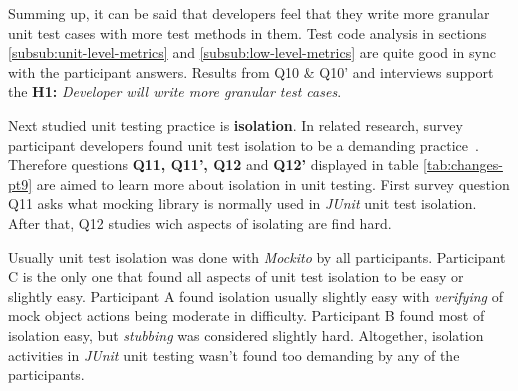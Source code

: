 Summing up, it can be said that developers feel that they write more granular unit test cases with more test methods in them.
Test code analysis in sections \ref{subsub:unit-level-metrics} and \ref{subsub:low-level-metrics}
are quite good in sync with the participant answers.
Results from Q10 \& Q10' and interviews support the \textbf{H1:} \textit{Developer will write more granular test cases}.

Next studied unit testing practice is \textbf{isolation}. In related research, survey participant developers found unit test isolation to be a demanding practice~\cite{daka2014survey}.
Therefore questions \textbf{Q11, Q11', Q12} and \textbf{Q12'} displayed in table \ref{tab:changes-pt9} are aimed to learn more about isolation in unit testing.
First survey question Q11 asks what mocking library is normally used in \textit{JUnit} unit test isolation. After that,
Q12 studies wich aspects of isolating are find hard.

Usually unit test isolation was done with \textit{Mockito} by all participants. Participant C is the only
one that found all aspects of unit test isolation to be easy or slightly easy. Participant A found isolation
usually slightly easy with \textit{verifying} of mock object actions being moderate in difficulty. Participant B
found most of isolation easy, but \textit{stubbing} was considered slightly hard. Altogether, isolation activities in \textit{JUnit} unit testing
wasn't found too demanding by any of the participants.

